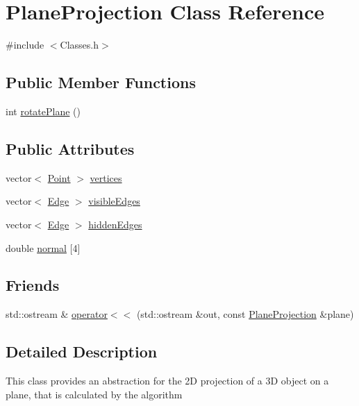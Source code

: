 \hypertarget{class_plane_projection}{}\section{Plane\+Projection Class Reference}
\label{class_plane_projection}


{\ttfamily \#include $<$Classes.\+h$>$}

\subsection*{Public Member Functions}
\begin{DoxyCompactItemize}
\item 
int \hyperlink{class_plane_projection_ac528e8dbd92be24628e136b10f4842f3}{rotate\+Plane} ()
\end{DoxyCompactItemize}
\subsection*{Public Attributes}
\begin{DoxyCompactItemize}
\item 
vector$<$ \hyperlink{class_point}{Point} $>$ \hyperlink{class_plane_projection_aa87b142fcdadad8437f3c733cba84e53}{vertices}
\item 
vector$<$ \hyperlink{class_edge}{Edge} $>$ \hyperlink{class_plane_projection_af0213c6d4a2dab2651f070215ebec049}{visible\+Edges}
\item 
vector$<$ \hyperlink{class_edge}{Edge} $>$ \hyperlink{class_plane_projection_ab66dbf817366f25e9e989f987d5f2c71}{hidden\+Edges}
\item 
double \hyperlink{class_plane_projection_a3741978f1a0ad2b5fcd6a1aac4678f93}{normal} \mbox{[}4\mbox{]}
\end{DoxyCompactItemize}
\subsection*{Friends}
\begin{DoxyCompactItemize}
\item 
std\+::ostream \& \hyperlink{class_plane_projection_a6542b7d2d9923de0082284419edfa85a}{operator$<$$<$} (std\+::ostream \&out, const \hyperlink{class_plane_projection}{Plane\+Projection} \&plane)
\end{DoxyCompactItemize}


\subsection{Detailed Description}
This class provides an abstraction for the 2D projection of a 3D object on a plane, that is calculated by the algorithm 

